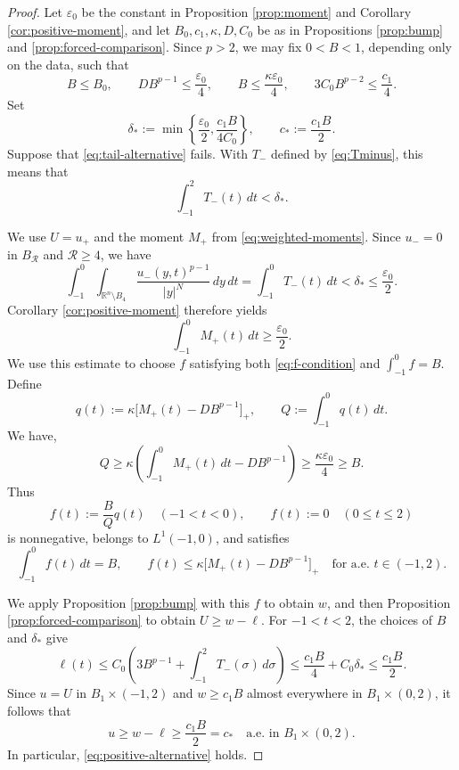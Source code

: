 \documentclass[10pt]{amsart}
\theoremstyle{plain}
\theoremstyle{definition}
\theoremstyle{remark}
\numberwithin{equation}{section}
\newcommand{\R}{\mathbb R}
\begin{document}
\begin{proof}
Let $\varepsilon_0$ be the constant in Proposition \ref{prop:moment} and Corollary
\ref{cor:positive-moment}, and let $B_0,c_1,\kappa,D,C_0$ be as in
Propositions \ref{prop:bump} and \ref{prop:forced-comparison}.
Since $p>2$, we may fix $0<B<1$, depending only on the data, such that
\[
B\le B_0,\qquad
DB^{p-1}\le\frac{\varepsilon_0}{4},\qquad
B\le\frac{\kappa\varepsilon_0}{4},\qquad
3C_0B^{p-2}\le\frac{c_1}{4}.
\]
Set
\[
\delta_*:=\min\left\{
\frac{\varepsilon_0}{2},\frac{c_1B}{4C_0}
\right\},
\qquad c_*:=\frac{c_1B}{2}.
\]
Suppose that \eqref{eq:tail-alternative} fails. With $T_-$ defined
by \eqref{eq:Tminus}, this means that
\[
\int_{-1}^2T_-(t)\,dt<\delta_*.
\]

We use $U=u_+$ and the moment $M_+$ from \eqref{eq:weighted-moments}.
Since $u_-=0$ in $B_{\mathcal R}$ and $\mathcal R\ge4$, we have
\[
\int_{-1}^0\int_{\R^n\setminus B_4}
\frac{u_-(y,t)^{p-1}}{|y|^N}\,dy\,dt
=\int_{-1}^0T_-(t)\,dt
<\delta_*\le\frac{\varepsilon_0}{2}.
\]
Corollary \ref{cor:positive-moment} therefore yields
\[
\int_{-1}^0M_+(t)\,dt\ge\frac{\varepsilon_0}{2}.
\]
We use this estimate to choose $f$ satisfying both
\eqref{eq:f-condition} and $\int_{-1}^0f=B$. Define
\[
q(t):=\kappa\bigl[M_+(t)-DB^{p-1}\bigr]_+,
\qquad Q:=\int_{-1}^0q(t)\,dt.
\]
We have, 
\[
Q\ge\kappa\left(\int_{-1}^0M_+(t)\,dt-DB^{p-1}\right)
\ge\frac{\kappa\varepsilon_0}{4}\ge B.
\]
Thus
\[
f(t):=\frac{B}{Q}q(t)\quad(-1<t<0),
\qquad f(t):=0\quad(0\le t\le2)
\]
is nonnegative, belongs to $L^1(-1,0)$, and satisfies
\[
\int_{-1}^0f(t)\,dt=B,
\qquad
f(t)\le\kappa\bigl[M_+(t)-DB^{p-1}\bigr]_+
\quad\text{for a.e. }t\in(-1,2).
\]

We apply Proposition \ref{prop:bump} with this $f$ to obtain $w$, and
then Proposition \ref{prop:forced-comparison} to obtain $U\ge w-\ell$.
For $-1<t<2$, the choices of $B$ and $\delta_*$ give
\[
\ell(t)
\le C_0\left(3B^{p-1}+\int_{-1}^2T_-(\sigma)\,d\sigma\right)
\le\frac{c_1B}{4}+C_0\delta_*
\le\frac{c_1B}{2}.
\]
Since $u=U$ in $B_1\times(-1,2)$ and
$w\ge c_1B$ almost everywhere in $B_1\times(0,2)$, it follows that
\[
u\ge w-\ell\ge\frac{c_1B}{2}=c_*
\quad\text{a.e. in }B_1\times(0,2).
\]
In particular, \eqref{eq:positive-alternative} holds.
\end{proof}
\end{document}

